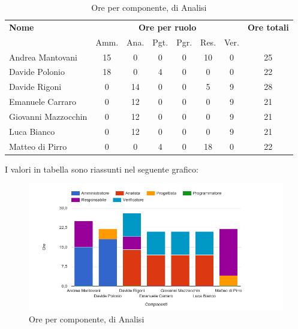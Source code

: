 \begin{table}[H]
\begin{tabular}{lccccccc}
\toprule
    \textbf{Nome}  & \multicolumn{6}{c}{\textbf{Ore per ruolo}} & \textbf{Ore totali} \\
     & Amm. & Ana. & Pgt. & Pgr. & Res. & Ver. & \\
    \midrule
    
	   Andrea Mantovani & 15 & 0 & 0 & 0 & 10 & 0 & 25 \\
	     Davide Polonio & 18 & 0 & 4 & 0 & 0 & 0 & 22 \\
	      Davide Rigoni & 0 & 14 & 0 & 0 & 5 & 9 & 28 \\
	   Emanuele Carraro & 0 & 12 & 0 & 0 & 0 & 9 & 21 \\
	Giovanni Mazzocchin & 0 & 12 & 0 & 0 & 0 & 9 & 21 \\
	        Luca Bianco & 0 & 12 & 0 & 0 & 0 & 9 & 21 \\
	    Matteo di Pirro & 0 & 0 & 4 & 0 & 18 & 0 & 22 \\
    
    \bottomrule
\end{tabular}
\caption{Ore per componente,  di Analisi}
\end{table}


I valori in tabella sono riassunti nel seguente grafico: \\ 

    \begin{figure}[H]
      \begin{center}
        \includegraphics[width=15cm]{res/img/suddivisioneRuoloProspettoOrario/orePerComponenteAnalisi.png}
      \caption{Ore per componente,  di Analisi}
      \end{center} 
    \end{figure}    
    
